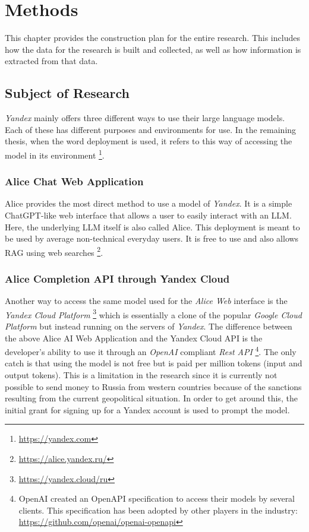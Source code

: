 \chapter{Methods}\label{chap:methods}

This chapter provides the construction plan for the entire research. This includes how the data for the research is built and collected, as well as how information is extracted from that data.

\section{Subject of Research}

\textit{Yandex} mainly offers three different ways to use their large language models. Each of these has different purposes and environments for use. In the remaining thesis, when the word deployment is used, it refers to this way of accessing the model in its environment \footnote{\url{https://yandex.com}}.

\subsection{Alice Chat Web Application}

Alice provides the most direct method to use a model of \textit{Yandex}. It is a simple ChatGPT-like web interface that allows a user to easily interact with an LLM. Here, the underlying LLM itself is also called Alice. This deployment is meant to be used by average non-technical everyday users. It is free to use and also allows RAG using web searches \footnote{\url{https://alice.yandex.ru/}}.

\subsection{Alice Completion API through Yandex Cloud}

Another way to access the same model used for the \textit{Alice Web} interface is the \textit{Yandex Cloud Platform} \footnote{\url{https://yandex.cloud/ru}} which is essentially a clone of the popular \textit{Google Cloud Platform} but instead running on the servers of \textit{Yandex}. The difference between the above Alice AI Web Application and the Yandex Cloud API is the developer's ability to use it through an \textit{OpenAI} compliant \textit{Rest API} \footnote{OpenAI created an OpenAPI specification to access their models by several clients. This specification has been adopted by other players in the industry: \url{https://github.com/openai/openai-openapi}}. The only catch is that using the model is not free but is paid per million tokens (input and output tokens). This is a limitation in the research since it is currently not possible to send money to Russia from western countries because of the sanctions resulting from the current geopolitical situation. In order to get around this, the initial grant for signing up for a Yandex account is used to prompt the model.

